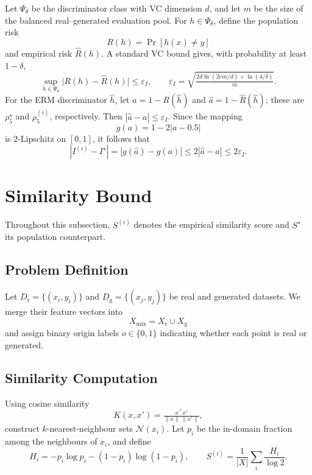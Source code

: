 Let $\Psi_\theta$ be the discriminator class with VC dimension $d$, and let $m$ be the size of the balanced real--generated evaluation pool. For $h\in\Psi_\theta$, define the population risk
\[
R(h)=\Pr[h(x)\ne y]
\]
and empirical risk $\hat R(h)$. A standard VC bound gives, with probability at least $1-\delta$,
\begin{equation}
\sup_{h\in\Psi_\theta}\bigl|R(h)-\hat R(h)\bigr|
\le \varepsilon_I,\qquad
\varepsilon_I=\sqrt{\tfrac{2d\ln(2em/d)+\ln(4/\delta)}{m}}.
\end{equation}
For the ERM discriminator $\hat h$, let $a=1-R(\hat h)$ and $\hat a=1-\hat R(\hat h)$; these are $\rho_5^\star$ and $\rho_5^{(i)}$, respectively. Then $|\hat a-a|\le \varepsilon_I$. Since the mapping
\[
g(a)=1-2|a-0.5|
\]
is $2$-Lipschitz on $[0,1]$, it follows that
\begin{equation}
|I^{(i)}-I^\star|
=
|g(\hat a)-g(a)|
\le 2|\hat a-a|
\le 2\varepsilon_I.
\end{equation}

\section{Similarity Bound}
\label{app:theory-similarity}
\label{appendix:similarity}

Throughout this subsection, $S^{(i)}$ denotes the empirical similarity score and $S^\star$ its population counterpart.

\subsection{Problem Definition}

Let $D_{\mathrm r}=\{(x_i,y_i)\}$ and $D_{\mathrm g}=\{(x_j,y_j)\}$ be real and
generated datasets. We merge their feature vectors into
\[
X_{\mathrm{mix}}=X_{\mathrm r}\cup X_{\mathrm g}
\]
and assign binary origin labels $o\in\{0,1\}$ indicating whether each point is
real or generated.

\subsection{Similarity Computation}

Using cosine similarity
\[
K(x,x')=\tfrac{x^\top x'}{\|x\|\,\|x'\|},
\]
construct $k$-nearest-neighbour sets $\mathcal N(x_i)$. Let $p_i$ be the in-domain fraction among the neighbours of $x_i$, and define
\begin{equation}
H_i=-p_i\log p_i-(1-p_i)\log(1-p_i),
\qquad
S^{(i)} = \frac{1}{|X|}\sum_i \frac{H_i}{\log 2}.
\end{equation}


